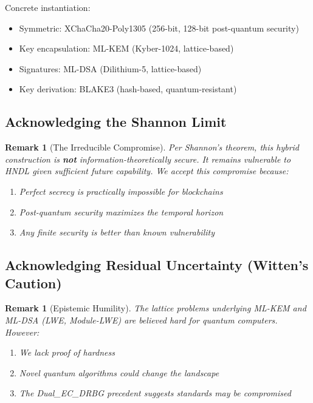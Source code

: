 \documentclass[11pt,a4paper]{article}
\newtheorem{remark}[theorem]{Remark}
\begin{document}
Concrete instantiation:
\begin{itemize}[noitemsep]
    \item Symmetric: XChaCha20-Poly1305 (256-bit, 128-bit post-quantum security)
    \item Key encapsulation: ML-KEM (Kyber-1024, lattice-based)
    \item Signatures: ML-DSA (Dilithium-5, lattice-based)
    \item Key derivation: BLAKE3 (hash-based, quantum-resistant)
\end{itemize}

\subsection{Acknowledging the Shannon Limit}

\begin{remark}[The Irreducible Compromise]
Per Shannon's theorem, this hybrid construction is \textbf{not} information-theoretically secure. It remains vulnerable to HNDL given sufficient future capability. We accept this compromise because:
\begin{enumerate}[noitemsep]
    \item Perfect secrecy is practically impossible for blockchains
    \item Post-quantum security maximizes the temporal horizon
    \item Any finite security is better than known vulnerability
\end{enumerate}
\end{remark}

\subsection{Acknowledging Residual Uncertainty (Witten's Caution)}

\begin{remark}[Epistemic Humility]
The lattice problems underlying ML-KEM and ML-DSA (LWE, Module-LWE) are believed hard for quantum computers. However:
\begin{enumerate}[noitemsep]
    \item We lack proof of hardness
    \item Novel quantum algorithms could change the landscape
    \item The Dual\_EC\_DRBG precedent suggests standards may be compromised
\end{enumerate}
\end{remark}
\end{document}

